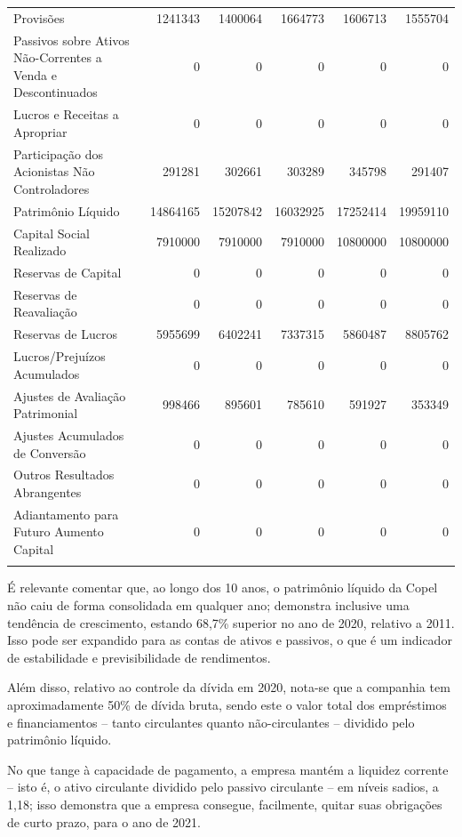 \documentclass[grad,numbers]{coppe}
\begin{document}
\begin{longtable}[t]{>{\raggedright\arraybackslash}p{6cm}rrrrr}
  Provisões & 1241343 & 1400064 & 1664773 & 1606713 & 1555704\\
  Passivos sobre Ativos Não-Correntes a Venda e Descontinuados & 0 & 0 & 0 & 0 & 0\\
  Lucros e Receitas a Apropriar & 0 & 0 & 0 & 0 & 0\\
  Participação dos Acionistas Não Controladores & 291281 & 302661 & 303289 & 345798 & 291407\\
  \addlinespace
  Patrimônio Líquido & 14864165 & 15207842 & 16032925 & 17252414 & 19959110\\
  Capital Social Realizado & 7910000 & 7910000 & 7910000 & 10800000 & 10800000\\
  Reservas de Capital & 0 & 0 & 0 & 0 & 0\\
  Reservas de Reavaliação & 0 & 0 & 0 & 0 & 0\\
  Reservas de Lucros & 5955699 & 6402241 & 7337315 & 5860487 & 8805762\\
  \addlinespace
  Lucros/Prejuízos Acumulados & 0 & 0 & 0 & 0 & 0\\
  Ajustes de Avaliação Patrimonial & 998466 & 895601 & 785610 & 591927 & 353349\\
  Ajustes Acumulados de Conversão & 0 & 0 & 0 & 0 & 0\\
  Outros Resultados Abrangentes & 0 & 0 & 0 & 0 & 0\\
  Adiantamento para Futuro Aumento Capital & 0 & 0 & 0 & 0 & 0\\*
  \end{longtable}
  \endgroup{}

  É relevante comentar que, ao longo dos 10 anos, o patrimônio líquido da Copel não caiu de forma consolidada em qualquer ano; demonstra inclusive uma tendência de crescimento, estando 68,7\% superior no ano de 2020, relativo a 2011. Isso pode ser expandido para as contas de ativos e passivos, o que é um indicador de estabilidade e previsibilidade de rendimentos.

  Além disso, relativo ao controle da dívida em 2020, nota-se que a companhia tem aproximadamente 50\% de dívida bruta, sendo este o valor total dos empréstimos e financiamentos -- tanto circulantes quanto não-circulantes -- dividido pelo patrimônio líquido.

  No que tange à capacidade de pagamento, a empresa mantém a liquidez corrente -- isto é, o ativo circulante dividido pelo passivo circulante -- em níveis sadios, a 1,18; isso demonstra que a empresa consegue, facilmente, quitar suas obrigações de curto prazo, para o ano de 2021.
\end{document}
